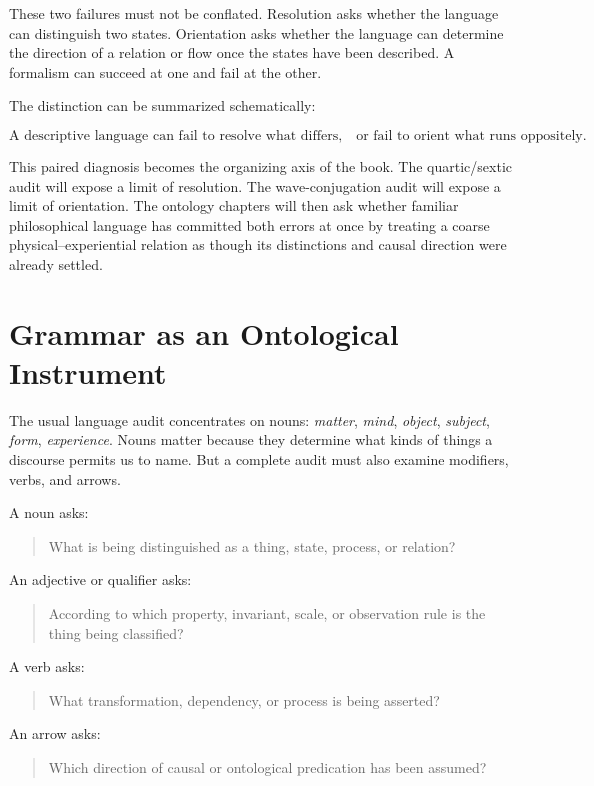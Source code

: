 These two failures must not be conflated. Resolution asks whether the language can distinguish two states. Orientation asks whether the language can determine the direction of a relation or flow once the states have been described. A formalism can succeed at one and fail at the other.

The distinction can be summarized schematically:

\[
\boxed{
\text{A descriptive language can fail to resolve what differs,}
\quad
\text{or fail to orient what runs oppositely.}
}
\]

This paired diagnosis becomes the organizing axis of the book. The quartic/sextic audit will expose a limit of resolution. The wave-conjugation audit will expose a limit of orientation. The ontology chapters will then ask whether familiar philosophical language has committed both errors at once by treating a coarse physical--experiential relation as though its distinctions and causal direction were already settled.

\section{Grammar as an Ontological Instrument}

The usual language audit concentrates on nouns: \emph{matter}, \emph{mind}, \emph{object}, \emph{subject}, \emph{form}, \emph{experience}. Nouns matter because they determine what kinds of things a discourse permits us to name. But a complete audit must also examine modifiers, verbs, and arrows.

A noun asks:

\begin{quote}
What is being distinguished as a thing, state, process, or relation?
\end{quote}

An adjective or qualifier asks:

\begin{quote}
According to which property, invariant, scale, or observation rule is the thing being classified?
\end{quote}

A verb asks:

\begin{quote}
What transformation, dependency, or process is being asserted?
\end{quote}

An arrow asks:

\begin{quote}
Which direction of causal or ontological predication has been assumed?
\end{quote}

